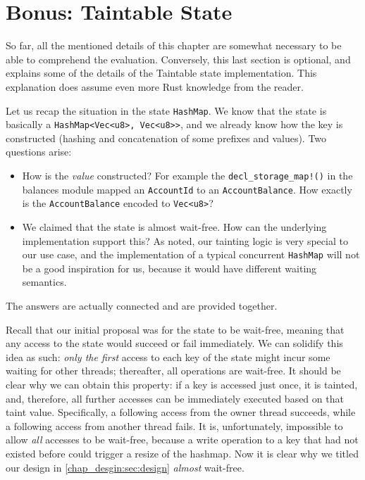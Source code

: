 \section{Bonus: Taintable State} \label{chap_impl:sec:bonus}

So far, all the mentioned details of this chapter are somewhat necessary to be
able to comprehend the evaluation. Conversely, this last section is optional, and explains some of the
details of the Taintable state implementation. This explanation does assume even more Rust
knowledge from the reader.

Let us recap the situation in the state \texttt{HashMap}. We know that the state is basically a
\texttt{HashMap<Vec<u8>, Vec<u8>>}, and we already know how the key is constructed (hashing and
concatenation of some prefixes and values). Two questions arise:

\begin{itemize}
	\item How is the \textit{value} constructed? For example the \texttt{decl\_storage\_map!()} in
	the balances module mapped an \texttt{AccountId} to an \texttt{AccountBalance}. How exactly is
	the \texttt{AccountBalance} encoded to \texttt{Vec<u8>}?
	\item We claimed that the state is almost wait-free. How can the underlying implementation
	support this? As noted, our tainting logic is very special to our use case, and the
	implementation of a typical concurrent \texttt{HashMap} will not be a good inspiration for us,
	because it would have different waiting semantics.
\end{itemize}

The answers are actually connected and are provided together.

Recall that our initial proposal was for the state to be wait-free, meaning that any access to the state
would succeed or fail immediately. We can solidify this idea as such: \textit{only the first} access
to each key of the state might incur some waiting for other threads; thereafter, all operations
are wait-free. It should be clear why we can obtain this property: if a key is accessed just
once, it is tainted, and, therefore, all further accesses can be immediately executed based on that
taint value. Specifically, a following access from the owner thread succeeds, while a following access from
another thread fails. It is, unfortunately,
impossible to allow \textit{all} accesses to be wait-free, because a write operation to a key that
had not existed before could trigger a resize of the hashmap. Now it is clear why we titled our design in \ref{chap_desgin:sec:design} \textit{almost} wait-free.

